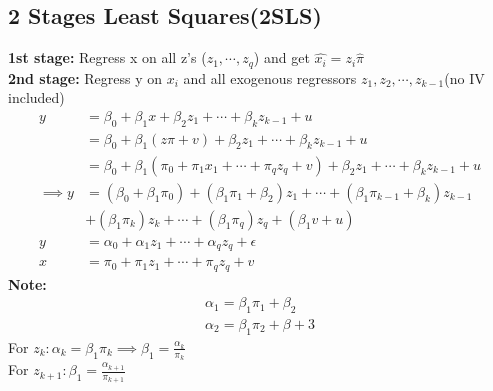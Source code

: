 \documentclass{article}
\theoremstyle{definition}
\theoremstyle{thrm}
\theoremstyle{lma}
\theoremstyle{ppst}
\theoremstyle{crlr}
\begin{document}
\subsection{2 Stages Least Squares(2SLS)}
\textbf{1st stage: } Regress x on all z's ($z_1,\cdots,z_q$) and get $\hat{x_i} = z_i\hat{\pi}$\\
\textbf{2nd stage: } Regress y on $x_i$ and all exogenous regressors $z_1,z_2,\cdots, z_{k-1}$(no IV included)
\begin{align*}
	y &= \beta_0+\beta_1x+\beta_2z_1+\cdots+\beta_k z_{k-1}+u\\
	&= \beta_0+\beta_1(z\pi+v)+\beta_2z_1+\cdots+\beta_k z_{k-1}+u\\
	&= \beta_0+\beta_1(\pi_0+\pi_1x_1+\cdots+\pi_q z_q+v)+\beta_2z_1+\cdots+\beta_k z_{k-1}+u\\
	\implies y &= (\beta_0+\beta_1\pi_0)+(\beta_1\pi_1+\beta_2)z_1+\cdots+(\beta_1\pi_{k-1}+\beta_k)z_{k-1}\\
	&+(\beta_1\pi_k)z_k+\cdots+(\beta_1\pi_q)z_q+(\beta_1v+u)\\
	y &= \alpha_0+\alpha_1z_1+\cdots+\alpha_qz_q+\epsilon\\
	x &= \pi_0+\pi_1z_1+\cdots+\pi_q z_q+v
\end{align*}
\textbf{Note:} 
\begin{align*}
	\alpha_1=\beta_1\pi_1+\beta_2\\
	\alpha_2 = \beta_1\pi_2 +\beta+3
\end{align*}
For $z_k: \alpha_k = \beta_1\pi_k \implies \beta_1 = \frac{\alpha_k}{\pi_k}$\\
For $z_{k+1}: \beta_1 = \frac{\alpha_{k+1}}{\pi_{k+1}}$
\end{document}
